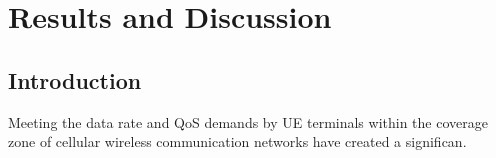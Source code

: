 \chapter{Results and Discussion}  \label{Ch:4}
	
\section{Introduction}\label{sec:Introduction4}
Meeting the data rate and QoS demands by  UE terminals within the coverage zone of cellular wireless communication networks have created a significan.

